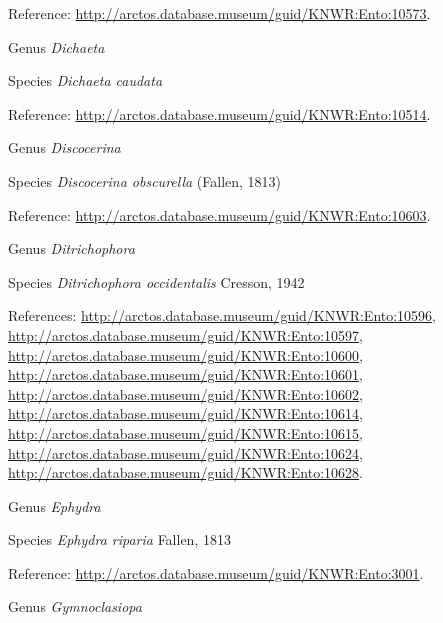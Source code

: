 \documentclass[9pt, article]{memoir}
\begin{document}
\begin{multicols}{2}
Reference: 
\url{http://arctos.database.museum/guid/KNWR:Ento:10573}.

\vspace{6pt}\noindent\hspace{30pt}Genus \textit{Dichaeta}


\vspace{6pt}\noindent\hspace{36pt}Species \textit{Dichaeta caudata}


Reference: 
\url{http://arctos.database.museum/guid/KNWR:Ento:10514}.

\vspace{6pt}\noindent\hspace{30pt}Genus \textit{Discocerina}


\vspace{6pt}\noindent\hspace{36pt}Species \textit{Discocerina obscurella} (Fallen, 1813)


Reference: 
\url{http://arctos.database.museum/guid/KNWR:Ento:10603}.

\vspace{6pt}\noindent\hspace{30pt}Genus \textit{Ditrichophora}


\vspace{6pt}\noindent\hspace{36pt}Species \textit{Ditrichophora occidentalis} Cresson, 1942


References: 
\url{http://arctos.database.museum/guid/KNWR:Ento:10596}, 
\url{http://arctos.database.museum/guid/KNWR:Ento:10597}, 
\url{http://arctos.database.museum/guid/KNWR:Ento:10600}, 
\url{http://arctos.database.museum/guid/KNWR:Ento:10601}, 
\url{http://arctos.database.museum/guid/KNWR:Ento:10602}, 
\url{http://arctos.database.museum/guid/KNWR:Ento:10614}, 
\url{http://arctos.database.museum/guid/KNWR:Ento:10615}, 
\url{http://arctos.database.museum/guid/KNWR:Ento:10624}, 
\url{http://arctos.database.museum/guid/KNWR:Ento:10628}.

\vspace{6pt}\noindent\hspace{30pt}Genus \textit{Ephydra}


\vspace{6pt}\noindent\hspace{36pt}Species \textit{Ephydra riparia} Fallen, 1813


Reference: 
\url{http://arctos.database.museum/guid/KNWR:Ento:3001}.

\vspace{6pt}\noindent\hspace{30pt}Genus \textit{Gymnoclasiopa}



\end{multicols}
\end{document}
